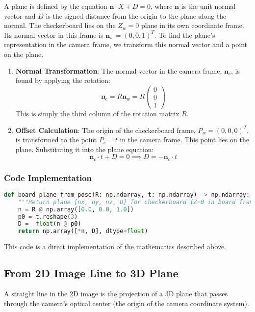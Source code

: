 \documentclass{article}
\begin{document}
A plane is defined by the equation $\mathbf{n} \cdot X + D = 0$, where $\mathbf{n}$ is the unit normal vector and $D$ is the signed distance from the origin to the plane along the normal. The checkerboard lies on the $Z_w=0$ plane in its own coordinate frame. Its normal vector in this frame is $\mathbf{n}_w = (0, 0, 1)^T$. To find the plane's representation in the camera frame, we transform this normal vector and a point on the plane.
\begin{enumerate}
    \item \textbf{Normal Transformation}: The normal vector in the camera frame, $\mathbf{n}_c$, is found by applying the rotation:
    \begin{equation}
    \mathbf{n}_c = R \mathbf{n}_w = R \begin{pmatrix} 0 \\ 0 \\ 1 \end{pmatrix}
    \end{equation}
    This is simply the third column of the rotation matrix $R$.
    \item \textbf{Offset Calculation}: The origin of the checkerboard frame, $P_w = (0,0,0)^T$, is transformed to the point $P_c = t$ in the camera frame. This point lies on the plane. Substituting it into the plane equation:
    \begin{equation}
    \mathbf{n}_c \cdot t + D = 0 \implies D = -\mathbf{n}_c \cdot t
    \end{equation}
\end{enumerate}

\subsubsection{Code Implementation}
\begin{lstlisting}[language=Python]
def board_plane_from_pose(R: np.ndarray, t: np.ndarray) -> np.ndarray:
    """Return plane [nx, ny, nz, D] for checkerboard (Z=0 in board frame)."""
    n = R @ np.array([0.0, 0.0, 1.0])
    p0 = t.reshape(3)
    D = -float(n @ p0)
    return np.array([*n, D], dtype=float)
\end{lstlisting}
This code is a direct implementation of the mathematics described above.

\subsection{From 2D Image Line to 3D Plane}
A straight line in the 2D image is the projection of a 3D plane that passes through the camera's optical center (the origin of the camera coordinate system).
\end{document}
